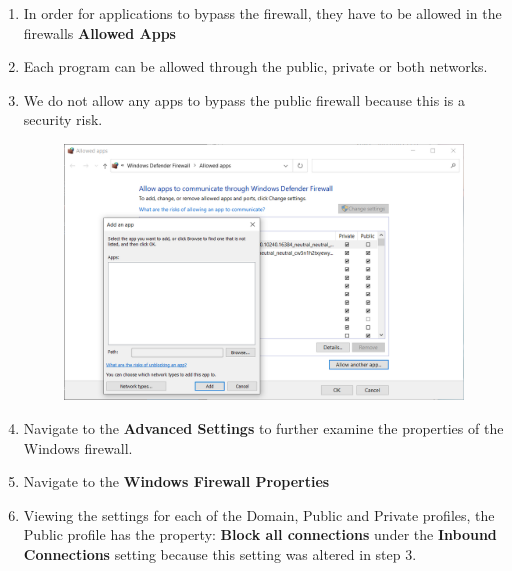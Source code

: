 \begin{enumerate}
\begin{figure}[H]
    \end{figure}
    \item In order for applications to bypass the firewall, they have to be allowed in the firewalls \textbf{Allowed Apps}
    \item Each program can be allowed through the public, private or both networks.
    \item We do not allow any apps to bypass the public firewall because this is a security risk.
    \begin{figure}[H]
        \includegraphics[width=\linewidth]{figures/pic8.png}
    \end{figure}
    \item Navigate to the \textbf{Advanced Settings} to further examine the properties of the Windows firewall.
    \item Navigate to the \textbf{Windows Firewall Properties}
    \item Viewing the settings for each of the Domain, Public and Private profiles, the Public profile has the property: \textbf{Block all connections} under the \textbf{Inbound Connections} setting because this setting was altered in step 3.
    \begin{figure}[H]
        \begin{subfigure}[b]{0.3\textwidth}
            \centering

\end{subfigure}
\end{figure}
\end{enumerate}

